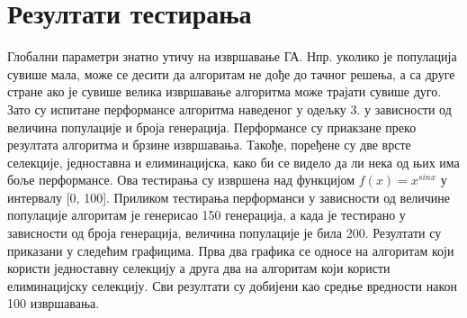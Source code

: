 \documentclass{article}
\begin{document}
\section{Резултати тестирања}
Глобални параметри знатно утичу на извршавање ГА. Нпр. уколико је популација сувише мала,
може се десити да алгоритам не дође до тачног решења, а са друге стране ако је сувише велика
извршавање алгоритма може трајати сувише дуго. Зато су испитане перформансе алгоритма наведеног
у одељку 3. у зависности од величина популације и броја генерација. Перформансе су приакзане преко 
резултата алгоритма и брзине извршавања. Такође, поређене су две врсте селекције, једноставна и елиминацијска, како би
се видело да ли нека од њих има боље перформансе. Ова тестирања су извршена над функцијом $f(x) = x^{sin x}$ у интервалу [0, 100].
Приликом тестирања перформанси у зависности од величине популације алгоритам је генерисао 150 генерација,
а када је тестирано у зависности од броја генерација, величина популације је била 200.
Резултати су приказани у следећим графицима. Прва два графика се односе на алгоритам који користи једноставну селекцију
а друга два на алгоритам који користи елиминацијску селекцију. Сви резултати су добијени као средње вредности након 
100 извршавања.
\end{document}
